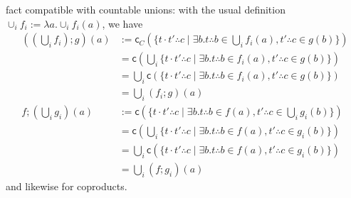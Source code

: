 \documentclass[acmsmall,screen,anonymous,review]{acmart}
\newcommand{\ms}[1]{\ensuremath{\mathsf{#1}}}
\newcommand{\tret}[2]{#1 \therefore #2}
\begin{document}
fact compatible with countable unions: with the usual definition $\cup_i f_i := \lambda a . \cup_i
f_i(a)$, we have
\begin{align*}
  ((\bigcup_i f_i) ; g)(a) &:= \ms{c}_C(\{
    \tret{t \cdot t'}{c} \mid \exists b . \tret{t}{b} \in \bigcup_i f_i(a), \tret{t'}{c} \in g(b)
  \}) \\
  &= \ms{c}(\bigcup_i \{
      \tret{t \cdot t'}{c} \mid \exists b . \tret{t}{b} \in f_i(a), \tret{t'}{c} \in g(b)
    \}) \\
  &= \bigcup_i \ms{c}(\{
      \tret{t \cdot t'}{c} \mid \exists b . \tret{t}{b} \in f_i(a), \tret{t'}{c} \in g(b)
    \}) \\
  &= \bigcup_i (f_i ; g)(a)
  \\
  f ; (\bigcup_i g_i)(a) &:= \ms{c}(\{
    \tret{t \cdot t'}{c} \mid \exists b . \tret{t}{b} \in f(a), \tret{t'}{c} \in \bigcup_i g_i(b)
  \}) \\
  &= \ms{c}(\bigcup_i \{
    \tret{t \cdot t'}{c} \mid \exists b . \tret{t}{b} \in f(a), \tret{t'}{c} \in g_i(b)
  \}) \\
  &= \bigcup_i \ms{c}(\{
    \tret{t \cdot t'}{c} \mid \exists b . \tret{t}{b} \in f(a), \tret{t'}{c} \in g_i(b)
  \}) \\
  &= \bigcup_i (f ; g_i)(a)
\end{align*}
and likewise for coproducts.
\end{document}

